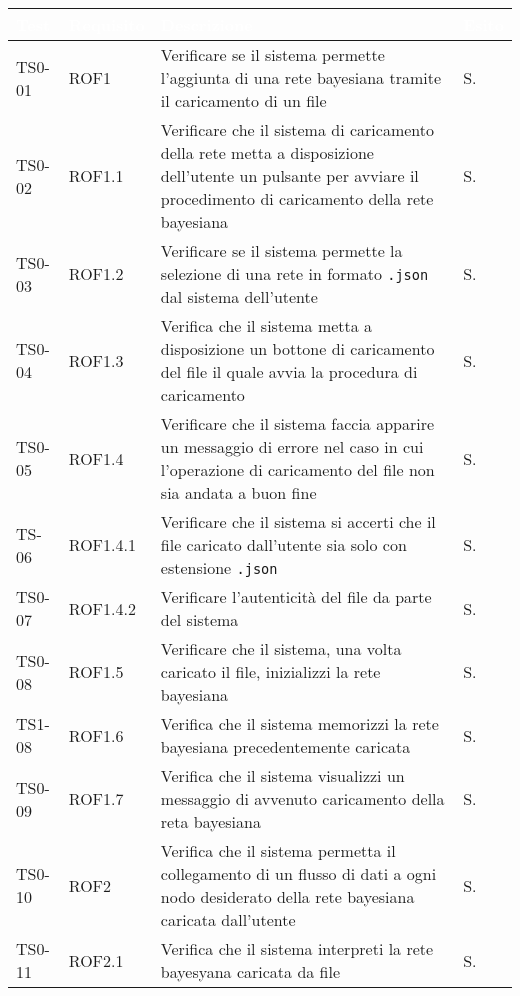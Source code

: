 \begin{longtable}{|C{.15\textwidth}|C{.14\textwidth}|m{.52\textwidth}|m{.08\textwidth}|}
\hline
{}\textbf{\textcolor{white}{Test}} & \textbf{\textcolor{white}{Requisito}} & \textbf{\textcolor{white}{Descrizione}} & \textbf{\textcolor{white}{Esito}}\\
\hline \hline
\endhead

TS0-01 & ROF1 & Verificare se il sistema permette l'aggiunta di una rete bayesiana tramite il caricamento di un file & S. \\
\hline
{} TS0-02 & ROF1.1 & Verificare che il sistema di caricamento della rete metta a disposizione dell'utente un pulsante per avviare il procedimento di caricamento della rete bayesiana & S.\\
\hline
TS0-03 & ROF1.2 & Verificare se il sistema permette la selezione di una rete in formato \texttt{.json} dal sistema dell'utente & S. \\
 TS0-04 & ROF1.3 & Verifica che il sistema metta a disposizione un bottone di caricamento del file il quale avvia la procedura di caricamento & S. \\
\hline
TS0-05 &  ROF1.4 & Verificare che il sistema faccia apparire un messaggio di errore nel caso in cui l'operazione di caricamento del file non sia andata a buon fine & S. \\
\hline
{} TS-06 & ROF1.4.1 & Verificare che il sistema si accerti che il file caricato dall'utente sia solo con estensione \texttt{.json} & S. \\
\hline
TS0-07 & ROF1.4.2 & Verificare l'autenticità del file da parte del sistema & S. \\
\hline 
{} TS0-08 & ROF1.5 & Verificare che il sistema, una volta caricato il file, inizializzi la rete bayesiana & S. \\
\hline 
TS1-08 & ROF1.6 & Verifica che il sistema memorizzi la rete bayesiana precedentemente caricata & S. \\
\hline
{} TS0-09 & ROF1.7 & Verifica che il sistema visualizzi un messaggio di avvenuto caricamento della reta bayesiana & S. \\
\hline
TS0-10 & ROF2 & Verifica che il sistema permetta il collegamento di un flusso di dati a ogni nodo desiderato della rete bayesiana caricata dall'utente & S. \\
\hline
{} TS0-11 & ROF2.1 & Verifica che il sistema interpreti la rete bayesyana caricata da file & S. \\

\end{longtable}
